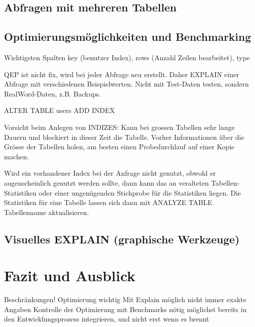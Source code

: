 \subsection{Abfragen mit mehreren Tabellen}
\subsection{Optimierungsmöglichkeiten und Benchmarking}
Wichtigsten Spalten key (benutzer Index), rows (Anzahl Zeilen bearbeitet), type

QEP ist nicht fix, wird bei jeder Abfrage neu erstellt. Daher EXPLAIN einer Abfrage mit verschiedenen Beispielwerten.
Nicht mit Test-Daten testen, sondern RealWord-Daten, z.B. Backups.

ALTER TABLE users ADD INDEX

Vorsicht beim Anlegen von INDIZES: Kann bei grossen Tabellen sehr lange Dauern und blockiert in dieser Zeit die Tabelle.
Vorher Informationen über die Grösse der Tabellen holen, am besten einen Probedurchlauf auf einer Kopie machen.

Wird ein vorhandener Index bei der Anfrage nicht genutzt, obwohl er augenscheinlich genutzt werden sollte, dann kann das an veralteten Tabellen-Statistiken oder einer ungenügenden Stichprobe für die Statistiken liegen. Die Statistiken für eine Tabelle lassen sich dann mit ANALYZE TABLE Tabellenname aktualisieren.

\subsection{Visuelles EXPLAIN (graphische Werkzeuge)}

\section{Fazit und Ausblick}

Beschränkungen!
Optimierung wichtig
Mit Explain möglich
nicht immer exakte Angaben
Kontrolle der Optimierung mit Benchmarks nötig
möglichst bereits in den Entwicklungsprozess integrieren, und nicht erst wenn es brennt

